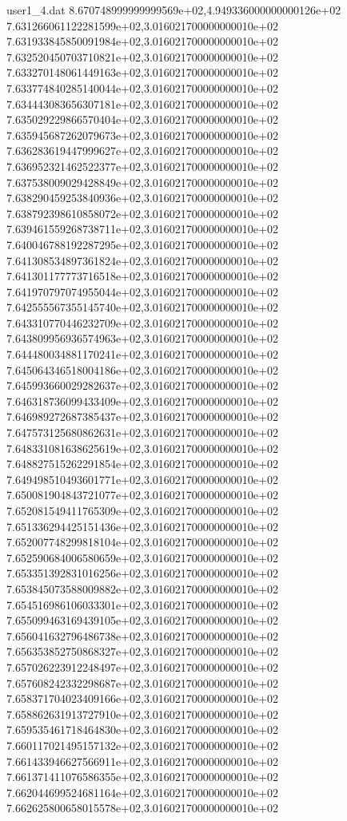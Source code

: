 \begin{filecontents}{user1_4.dat}
8.670748999999999569e+02,4.949336000000000126e+02
7.631266061122281599e+02,3.016021700000000010e+02
7.631933845850091984e+02,3.016021700000000010e+02
7.632520450703710821e+02,3.016021700000000010e+02
7.633270148061449163e+02,3.016021700000000010e+02
7.633774840285140044e+02,3.016021700000000010e+02
7.634443083656307181e+02,3.016021700000000010e+02
7.635029229866570404e+02,3.016021700000000010e+02
7.635945687262079673e+02,3.016021700000000010e+02
7.636283619447999627e+02,3.016021700000000010e+02
7.636952321462522377e+02,3.016021700000000010e+02
7.637538009029428849e+02,3.016021700000000010e+02
7.638290459253840936e+02,3.016021700000000010e+02
7.638792398610858072e+02,3.016021700000000010e+02
7.639461559268738711e+02,3.016021700000000010e+02
7.640046788192287295e+02,3.016021700000000010e+02
7.641308534897361824e+02,3.016021700000000010e+02
7.641301177773716518e+02,3.016021700000000010e+02
7.641970797074955044e+02,3.016021700000000010e+02
7.642555567355145740e+02,3.016021700000000010e+02
7.643310770446232709e+02,3.016021700000000010e+02
7.643809956936574963e+02,3.016021700000000010e+02
7.644480034881170241e+02,3.016021700000000010e+02
7.645064346518004186e+02,3.016021700000000010e+02
7.645993660029282637e+02,3.016021700000000010e+02
7.646318736099433409e+02,3.016021700000000010e+02
7.646989272687385437e+02,3.016021700000000010e+02
7.647573125680862631e+02,3.016021700000000010e+02
7.648331081638625619e+02,3.016021700000000010e+02
7.648827515262291854e+02,3.016021700000000010e+02
7.649498510493601771e+02,3.016021700000000010e+02
7.650081904843721077e+02,3.016021700000000010e+02
7.652081549411765309e+02,3.016021700000000010e+02
7.651336294425151436e+02,3.016021700000000010e+02
7.652007748299818104e+02,3.016021700000000010e+02
7.652590684006580659e+02,3.016021700000000010e+02
7.653351392831016256e+02,3.016021700000000010e+02
7.653845073588009882e+02,3.016021700000000010e+02
7.654516986106033301e+02,3.016021700000000010e+02
7.655099463169439105e+02,3.016021700000000010e+02
7.656041632796486738e+02,3.016021700000000010e+02
7.656353852750868327e+02,3.016021700000000010e+02
7.657026223912248497e+02,3.016021700000000010e+02
7.657608242332298687e+02,3.016021700000000010e+02
7.658371704023409166e+02,3.016021700000000010e+02
7.658862631913727910e+02,3.016021700000000010e+02
7.659535461718464830e+02,3.016021700000000010e+02
7.660117021495157132e+02,3.016021700000000010e+02
7.661433946627566911e+02,3.016021700000000010e+02
7.661371411076586355e+02,3.016021700000000010e+02
7.662044699524681164e+02,3.016021700000000010e+02
7.662625800658015578e+02,3.016021700000000010e+02

\end{filecontents}
